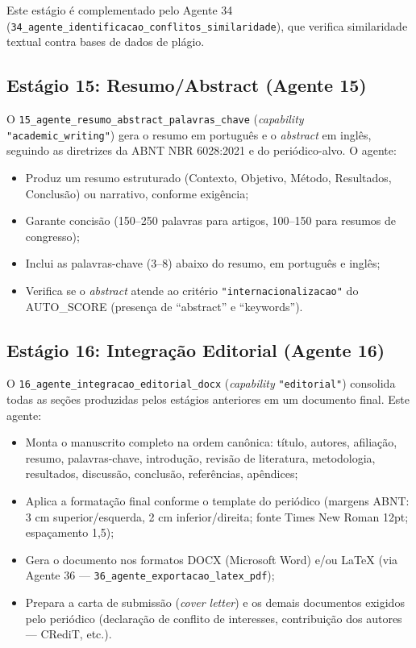 Este estágio é complementado pelo Agente 34
(\texttt{34\_agente\_identificacao\_conflitos\_similaridade}), que
verifica similaridade textual contra bases de dados de plágio.

\subsection{Estágio 15: Resumo/Abstract (Agente 15)}
\label{sec:estagio15}

O \texttt{15\_agente\_resumo\_abstract\_palavras\_chave}
(\textit{capability} \texttt{"academic\_writing"}) gera o resumo em
português e o \textit{abstract} em inglês, seguindo as diretrizes
da ABNT NBR 6028:2021 e do periódico-alvo. O agente:

\begin{itemize}
    \item Produz um resumo estruturado (Contexto, Objetivo, Método,
    Resultados, Conclusão) ou narrativo, conforme exigência;

    \item Garante concisão (150--250 palavras para artigos,
    100--150 para resumos de congresso);

    \item Inclui as palavras-chave (3--8) abaixo do resumo, em
    português e inglês;

    \item Verifica se o \textit{abstract} atende ao critério
    \texttt{"internacionalizacao"} do AUTO\_SCORE (presença de
    ``abstract'' e ``keywords'').
\end{itemize}

\subsection{Estágio 16: Integração Editorial (Agente 16)}
\label{sec:estagio16}

O \texttt{16\_agente\_integracao\_editorial\_docx}
(\textit{capability} \texttt{"editorial"}) consolida todas as
seções produzidas pelos estágios anteriores em um documento
final. Este agente:

\begin{itemize}
    \item Monta o manuscrito completo na ordem canônica: título,
    autores, afiliação, resumo, palavras-chave, introdução, revisão
    de literatura, metodologia, resultados, discussão, conclusão,
    referências, apêndices;

    \item Aplica a formatação final conforme o template do
    periódico (margens ABNT: 3 cm superior/esquerda, 2 cm
    inferior/direita; fonte Times New Roman 12pt; espaçamento 1,5);

    \item Gera o documento nos formatos DOCX (Microsoft Word) e/ou
    LaTeX (via Agente 36 — \texttt{36\_agente\_exportacao\_latex\_pdf});

    \item Prepara a carta de submissão (\textit{cover letter}) e os
    demais documentos exigidos pelo periódico (declaração de
    conflito de interesses, contribuição dos autores — CRediT,
    etc.).
\end{itemize}

